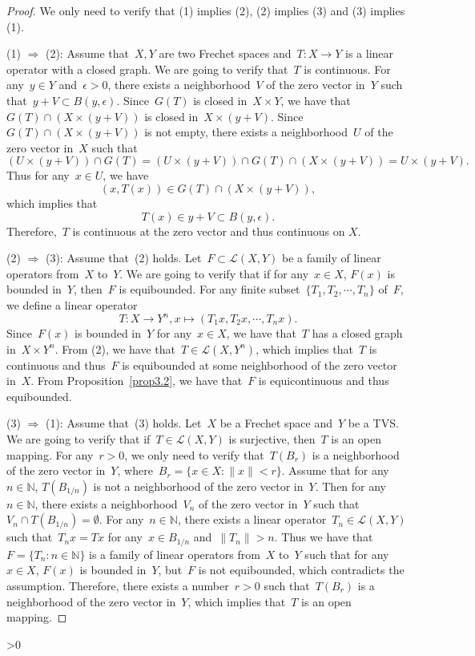 \documentclass[12pt,a4paper,draft]{article}  %
\newcommand{\bibfile}{\jobname.bib}  %
\newcounter{cite}
\theoremstyle{definition}
\numberwithin{equation}{section}
\newcommand{\NN}{\mathbb{N}}
\begin{document}
\begin{proof}
    We only need to verify that (1) implies (2), (2) implies (3) and (3) implies (1).

    (1) $\Rightarrow$ (2): Assume that~$X,Y$ are two Frechet spaces and~$T: X \rightarrow Y$ is a linear operator with a closed graph.
    We are going to verify that~$T$ is continuous.
    For any~$y \in Y$ and~$\epsilon > 0$, there exists a neighborhood~$V$ of the zero vector in~$Y$ such that~$y+V \subset B(y,\epsilon)$.
    Since~$G(T)$ is closed in~$X \times Y$, we have that~$G(T) \cap (X \times (y+V))$ is closed in~$X \times (y+V)$.
    Since~$G(T) \cap (X \times (y+V))$ is not empty, there exists a neighborhood~$U$ of the zero vector in~$X$ such that
    $$(U \times (y+V)) \cap G(T) = (U \times (y+V)) \cap G(T) \cap (X \times (y+V)) = U \times (y+V).$$
    Thus for any~$x \in U$, we have
    $$(x,T(x)) \in G(T) \cap (X \times (y+V)),$$
    which implies that
    $$T(x) \in y + V \subset B(y,\epsilon).$$
    Therefore,~$T$ is continuous at the zero vector and thus continuous on $X$. 

    (2) $\Rightarrow$ (3): Assume that~(2) holds. Let~$F \subset \mathcal{L}(X,Y)$ be a family of linear operators from~$X$ to~$Y$. 
    We are going to verify that if for any~$x \in X$, $F(x)$ is bounded in~$Y$, then~$F$ is equibounded.
    For any finite subset~$\{T_1,T_2,\cdots,T_n\}$ of~$F$, we define a linear operator
    $$ T: X \rightarrow Y^n, x \mapsto (T_1 x, T_2 x, \cdots, T_n x). $$
    Since~$F(x)$ is bounded in~$Y$ for any~$x \in X$, we have that~$T$ has a closed graph in~$X \times Y^n$.
    From (2), we have that~$T \in \mathcal{L}(X,Y^n)$, which implies that~$T$ is continuous and thus~$F$ is equibounded at some neighborhood of the zero vector in~$X$.
    From Proposition~\eqref{prop3.2}, we have that~$F$ is equicontinuous and thus equibounded.

    (3) $\Rightarrow$ (1): Assume that~(3) holds. Let~$X$ be a Frechet space and~$Y$ be a TVS.
    We are going to verify that if~$T \in \mathcal{L}(X,Y)$ is surjective, then~$T$ is an open mapping.
    For any~$r > 0$, we only need to verify that~$T(B_r)$ is a neighborhood of the zero vector in~$Y$, where~$B_r = \{x \in X: \|x\| < r\}$.
    Assume that for any~$n \in \NN$, $T(B_{1/n})$ is not a neighborhood of the zero vector in~$Y$.
    Then for any~$n \in \NN$, there exists a neighborhood~$V_n$ of the zero vector in~$Y$ such that~$V_n \cap T(B_{1/n}) = \emptyset$.
    For any~$n \in \NN$, there exists a linear operator~$T_n \in \mathcal{L}(X,Y)$ such that~$T_n x = T x$ for any~$x \in B_{1/n}$ and~$\|T_n\| > n$.
    Thus we have that~$F = \{T_n: n \in \NN\}$ is a family of linear operators from~$X$ to~$Y$ such that for any~$x \in X$, $F(x)$ is bounded in~$Y$, but~$F$ is not equibounded, which contradicts the assumption.
    Therefore, there exists a number~$r > 0$ such that~$T(B_r)$ is a neighborhood of the zero vector in~$Y$, which implies that~$T$ is an open mapping.
\end{proof}

\ifnum\value{cite}>0
    \small
    
    
\fi

\end{document}

